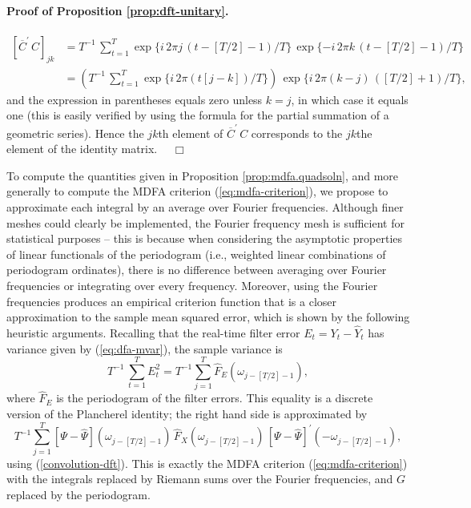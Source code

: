 \documentclass[a4paper]{book}
\begin{document}
\paragraph{Proof of Proposition \ref{prop:dft-unitary}.}
\begin{align*}
  {\left[ \overline{C}^{\prime} \, C \right] }_{jk} & =
 T^{-1} \, \sum_{t=1}^T \exp \{ i  \, 2 \pi j \, (t-[T/2]-1)/T \} \,
	\exp  \{ - i \, 2 \pi k \, (t - [T/2]-1)/T \} \\
	& = \left( T^{-1} \, \sum_{t=1}^T \exp \{ i \, 2 \pi (t [j-k]) /T \} \right) \,
	\exp \{ i \, 2 \pi (k-j) \, ([T/2]+1)/T \},
\end{align*}
 and the expression in parentheses equals zero unless $k=j$, in which case it equals
 one (this is easily verified by using the formula for the partial summation of a
 geometric series).  Hence  the $jk$th element of $\overline{C}^{\prime} \, C$ 
 corresponds to the $jk$the element of the identity matrix.  $\quad \Box$

\vspace{.5cm}

To compute the quantities given in Proposition \ref{prop:mdfa.quadsoln}, and more
 generally to compute the MDFA criterion (\ref{eq:mdfa-criterion}), we propose 
 to approximate each integral by an average over Fourier frequencies.  
 Although finer meshes could clearly be implemented, the Fourier frequency mesh
 is sufficient for statistical purposes -- this is because when considering
 the asymptotic properties of linear functionals of the periodogram (i.e.,
 weighted linear combinations of periodogram ordinates), there is no difference
 between averaging over Fourier frequencies or integrating over every frequency.
 Moreover, using the Fourier frequencies produces an empirical criterion function
 that is a closer approximation to the sample mean squared error, which is shown
 by the following heuristic arguments.  Recalling that the real-time filter error
 $E_t = Y_t - \widehat{Y}_t$ has variance given by (\ref{eq:dfa-mvar}), the sample 
 variance is
\[
  T^{-1} \, \sum_{t=1}^T E_t^2 = T^{-1} \sum_{j=1}^T \widehat{F}_E (\omega_{j-[T/2]-1}),
\]
 where $\widehat{F}_E$ is the periodogram of the filter errors.  This equality
 is a discrete version of the Plancherel identity; the right hand side is approximated
 by 
\[
 T^{-1} \sum_{j=1}^T \left[ \Psi - \widehat{\Psi} \right](\omega_{j-[T/2]-1}) \,
   \widehat{F}_X (\omega_{j-[T/2]-1}) \,
 {\left[ \Psi - \widehat{\Psi} \right]}^{\prime} (-\omega_{j-[T/2]-1}),
\]
  using (\ref{convolution-dft}).  This is exactly the MDFA criterion
 (\ref{eq:mdfa-criterion}) with the integrals replaced by Riemann
 sums over the Fourier frequencies, and $G$ replaced by the periodogram.
\end{document}
